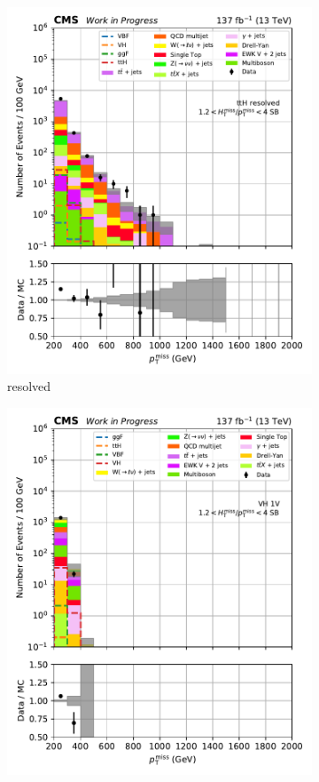 \begin{figure}[htbp]
\begin{subfigure}[b]{0.24\textwidth}
        \includegraphics[width=\textwidth]{figures/region_plots/2016to18/sideband_2/ttH_resolved.pdf}
        \caption{\ttH resolved}
    \end{subfigure}
    \hfill
    \begin{subfigure}[b]{0.24\textwidth}
        \includegraphics[width=\textwidth]{figures/region_plots/2016to18/sideband_2/VH_1V.pdf}

\end{subfigure}
\end{figure}
